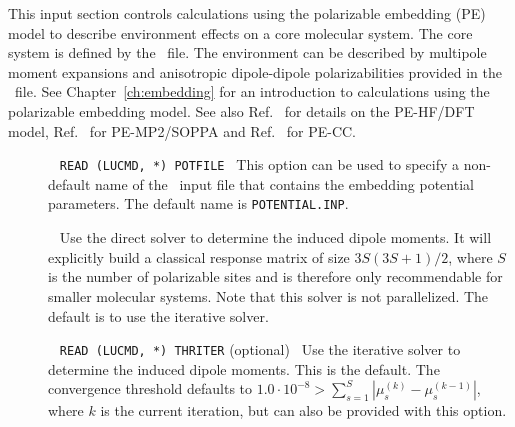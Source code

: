 This input section controls calculations using the polarizable
embedding (PE) model to describe environment effects on a core
molecular system. The core system is defined by the \molinp\ file. The environment can be described by multipole moment expansions
and anisotropic dipole-dipole polarizabilities provided in the \potinp\
file. See Chapter~\ref{ch:embedding} for an introduction to
calculations using the polarizable embedding model. See also Ref.~\cite{pescf} for details on the PE-HF/DFT model, Ref.~\cite{pesoppa} for PE-MP2/SOPPA and Ref.~\cite{pecc} for PE-CC.


\begin{description}

\item[]\verb| |\newline
\verb|READ (LUCMD, *) POTFILE|\verb| |\newline
This option can be used to specify a non-default name of the \potinp\ input file that contains the embedding potential parameters. The default name is \verb|POTENTIAL.INP|.

\item[]\verb| |\newline
Use the direct solver to determine the induced dipole moments. It will explicitly build a classical response matrix of size $3S(3S+1)/2$, where $S$ is the number of polarizable sites and is therefore only recommendable for smaller molecular systems. Note that this solver is not parallelized. The default is to use the iterative solver.

\item[]\verb| |\newline
\verb|READ (LUCMD, *) THRITER| (optional)\verb| |\newline
Use the iterative solver to determine the induced dipole moments. This is the default. The convergence threshold defaults to $1.0\cdot10^{-8} > \sum_{s=1}^{S}|\mu_s^{(k)} - \mu_s^{(k-1)}|$, where $k$ is the current iteration, but can also be provided with this option.


\end{description}

